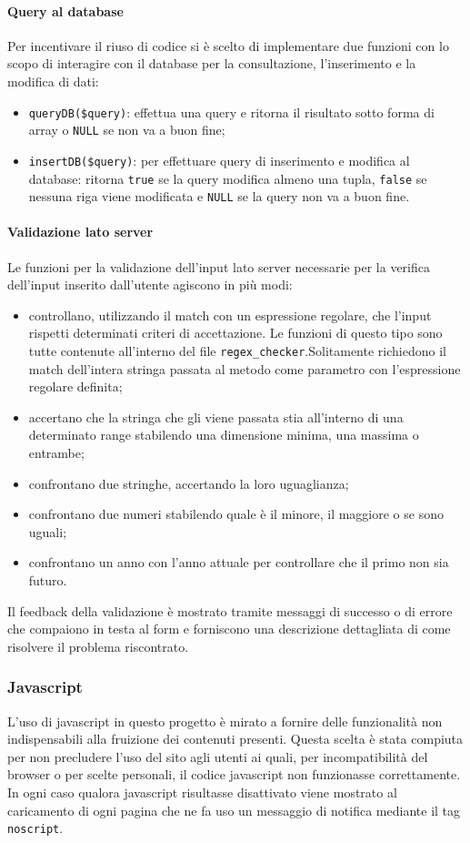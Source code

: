 \documentclass[12pt,a4paper,headings=optiontohead]{article}
\begin{document}
	\paragraph{Query al database}
	Per incentivare il riuso di codice si è scelto di implementare due funzioni con lo scopo di interagire con il database per la consultazione, l'inserimento e la modifica di dati:
	\begin{itemize}
		\item \texttt{queryDB(\$query)}: effettua una query e ritorna il risultato sotto forma di array o \texttt{NULL} se non va a buon fine;
		\item \texttt{insertDB(\$query)}: per effettuare query di inserimento e modifica al database: ritorna \texttt{true} se la query modifica almeno una tupla, \texttt{false} se nessuna riga viene modificata e \texttt{NULL} se la query non va a buon fine.
	\end{itemize}
	\paragraph{Validazione lato server}
	Le funzioni per la validazione dell'input lato server necessarie per la verifica dell'input inserito dall'utente agiscono in più modi:
	\begin{itemize}
		\item controllano, utilizzando il match con un espressione regolare, che l'input rispetti determinati criteri di accettazione. Le funzioni di questo tipo sono tutte contenute all'interno del file \texttt{regex\_checker}.Solitamente richiedono il match dell'intera stringa passata al metodo come parametro con l'espressione regolare definita;
		\item accertano che la stringa che gli viene passata stia all'interno di una determinato range stabilendo una dimensione minima, una massima o entrambe;
		\item confrontano due stringhe, accertando la loro uguaglianza;
		\item confrontano due numeri stabilendo quale è il minore, il maggiore o se sono uguali;
		\item confrontano un anno con l'anno attuale per controllare che il primo non sia futuro.
	\end{itemize}
	Il feedback della validazione è mostrato tramite messaggi di successo o di errore che compaiono in testa al form e forniscono una descrizione dettagliata di come risolvere il problema riscontrato.
	
	
	\subsubsection{Javascript}
	L'uso di javascript in questo progetto è mirato a fornire delle funzionalità non indispensabili alla fruizione dei contenuti presenti. Questa scelta è stata compiuta per non precludere l'uso del sito agli utenti ai quali, per incompatibilità del browser o per scelte personali, il codice javascript non funzionasse correttamente. In ogni caso qualora javascript risultasse disattivato viene mostrato al caricamento di ogni pagina che ne fa uso un messaggio di notifica mediante il tag \texttt{noscript}. 
\end{document}
